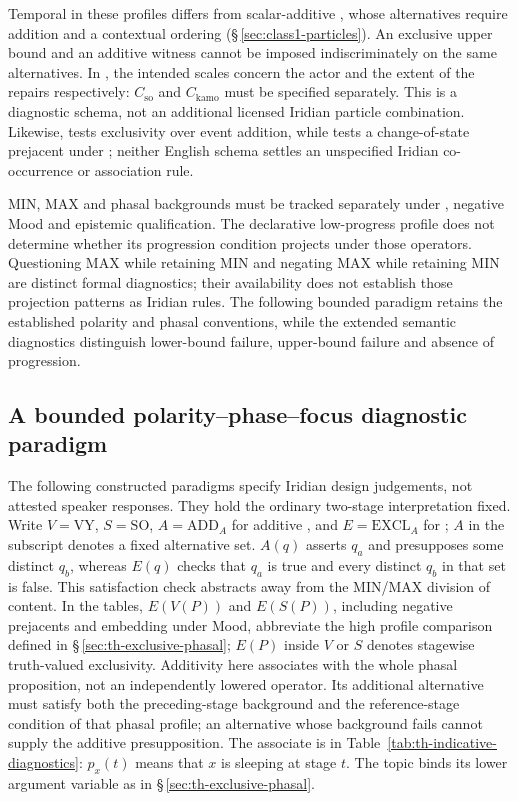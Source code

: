 Temporal  in these profiles differs from scalar-additive 
, whose alternatives require addition and a contextual ordering
(§\,\ref{sec:class1-particles}). An exclusive upper bound and an additive
witness cannot be imposed indiscriminately on the same alternatives. In
, the intended
scales concern the actor and the extent of the repairs respectively:
$C_{\mathrm{so}}$ and $C_{\mathrm{kamo}}$ must be specified separately.
This is a diagnostic schema, not an additional licensed Iridian particle
combination. Likewise, 
tests exclusivity over event addition, while  tests a change-of-state prejacent under ; neither
English schema settles an unspecified Iridian co-occurrence or association
rule.

MIN, MAX and phasal backgrounds must be tracked separately under ,
negative Mood and epistemic qualification. The declarative low-progress
profile does not determine whether its progression condition projects under
those operators. Questioning MAX while retaining MIN and negating MAX while
retaining MIN are distinct formal diagnostics; their availability does not
establish those projection patterns as Iridian rules. The following bounded
paradigm retains the established polarity and phasal conventions, while the
extended semantic diagnostics distinguish lower-bound failure, upper-bound
failure and absence of progression.


\subsection{A bounded polarity--phase--focus diagnostic paradigm}
\label{sec:th-polarity-diagnostics}

The following constructed paradigms specify Iridian design judgements, not
attested speaker responses. They hold the ordinary two-stage interpretation
fixed. Write $V=\mathrm{VY}$, $S=\mathrm{SO}$,
$A=\mathrm{ADD}_A$ for additive , and $E=\mathrm{EXCL}_A$ for
; $A$ in the subscript denotes a fixed alternative set.
$A(q)$ asserts $q_a$ and presupposes some distinct $q_b$, whereas $E(q)$
checks that $q_a$ is true and every distinct $q_b$ in that set is false.
This satisfaction check abstracts away from the MIN/MAX division of content. In the tables,
$E(V(P))$ and $E(S(P))$, including negative prejacents and embedding under
Mood, abbreviate the high profile comparison defined in
§\,\ref{sec:th-exclusive-phasal}; $E(P)$ inside $V$ or $S$ denotes
stagewise truth-valued exclusivity. Additivity here associates with the whole phasal proposition, not an independently lowered
operator. Its additional alternative must satisfy both the preceding-stage
background and the reference-stage condition of that phasal profile; an
alternative whose background fails cannot supply the additive presupposition.
The associate is  in Table~\ref{tab:th-indicative-diagnostics}:
$p_x(t)$ means that $x$ is sleeping at stage $t$. The topic binds its lower
argument variable as in §\,\ref{sec:th-exclusive-phasal}.

